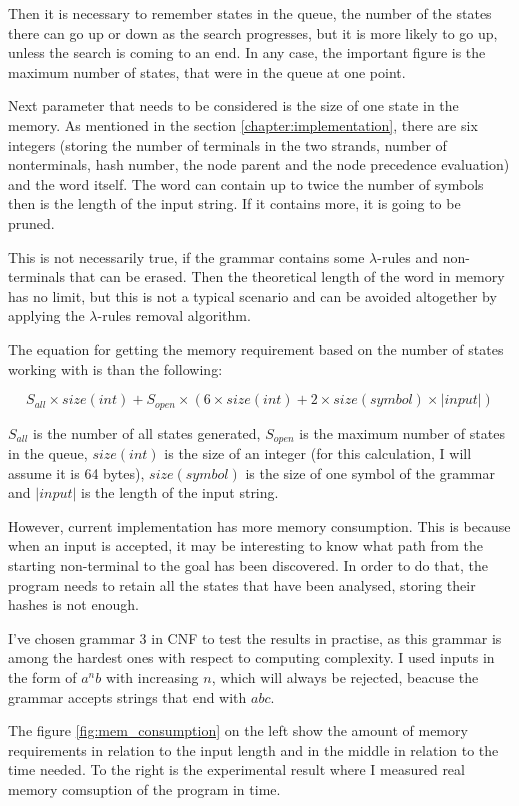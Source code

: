 Then it is necessary to remember states in the queue, the number of the states there can go up or down as the search progresses, but it is more likely to go up, unless the search is coming to an end. In any case, the important figure is the maximum number of states, that were in the queue at one point.

Next parameter that needs to be considered is the size of one state in the memory. As mentioned in the section \ref{chapter:implementation}, there are six integers (storing the number of terminals in the two strands, number of nonterminals, hash number, the node parent and the node precedence evaluation) and the word itself. The word can contain up to twice the number of symbols then is the length of the input string. If it contains more, it is going to be pruned.

This is not necessarily true, if the grammar contains some $\lambda$-rules and non-terminals that can be erased. Then the theoretical length of the word in memory has no limit, but this is not a typical scenario and can be avoided altogether by applying the $\lambda$-rules removal algorithm.

The equation for getting the memory requirement based on the number of states working with is than the following:

$$S_{all} \times size(int) + S_{open} \times (6 \times size(int) + 2 \times size(symbol) \times |input|)$$

$S_{all}$ is the number of all states generated, $S_{open}$ is the maximum number of states in the queue, $size(int)$ is the size of an integer (for this calculation, I will assume it is 64 bytes), $size(symbol)$ is the size of one symbol of the grammar and $|input|$ is the length of the input string.

However, current implementation has more memory consumption. This is because when an input is accepted, it may be interesting to know what path from the starting non-terminal to the goal has been discovered. In order to do that, the program needs to retain all the states that have been analysed, storing their hashes is not enough.

I've chosen grammar 3 in CNF to test the results in practise, as this grammar is among the hardest ones with respect to computing complexity. I used inputs in the form of $a^nb$ with increasing $n$, which will always be rejected, beacuse the grammar accepts strings that end with $abc$.

The figure \ref{fig:mem_consumption} on the left show the amount of memory requirements in relation to the input length and in the middle in relation to the time needed. To the right is the experimental result where I measured real memory comsuption of the program in time.

